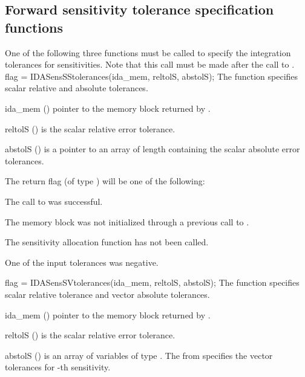 \subsection{Forward sensitivity tolerance specification functions}
\label{sss:idafwdtolerances}
One of the following three functions must be called to specify the
integration tolerances for sensitivities. Note that this call must be made after 
the call to .
{
  flag = IDASensSStolerances(ida\_mem, reltolS, abstolS);
}
{
  The function  specifies scalar relative and absolute
  tolerances.
}
{
  \begin{args}
  \item[ida\_mem] ()
    pointer to the {\idas} memory block returned by .
  \item[reltolS] ()
    is the scalar relative error tolerance.
  \item[abstolS] ()
    is a pointer to an array of length  containing the scalar absolute 
    error tolerances.
  \end{args}
}
{
  The return flag  (of type ) will be one of the following:
  \begin{args}
  \item[\Id{IDA\_SUCCESS}]
    The call to  was successful.
  \item[\Id{IDA\_MEM\_NULL}] 
    The {\idas} memory block was not initialized through a previous call to
    .
  \item[\Id{IDA\_NO\_SENS}] 
    The sensitivity allocation function  has not been called.
  \item[\Id{IDA\_ILL\_INPUT}] 
    One of the input tolerances was negative.
  \end{args}
}
{}
{
  flag = IDASensSVtolerances(ida\_mem, reltolS, abstolS);
}
{
  The function  specifies scalar relative tolerance and
  vector absolute tolerances.
}
{
  \begin{args}
  \item[ida\_mem] ()
    pointer to the {\idas} memory block returned by .
  \item[reltolS] ()
    is the scalar relative error tolerance.
  \item[abstolS] ()
    is an array of  variables of type . The  from
     specifies the vector tolerances for -th sensitivity.
  \end{args}
}
